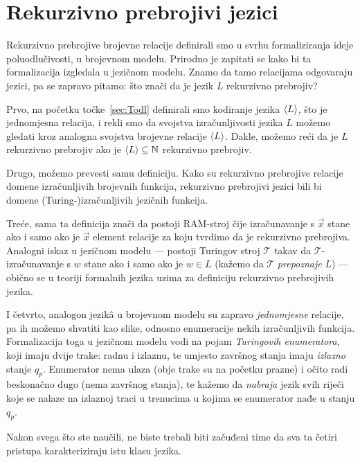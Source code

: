 \section{Rekurzivno prebrojivi jezici}\label{sec:relang}

Rekurzivno prebrojive brojevne relacije definirali smo u svrhu formaliziranja ideje poluodlučivosti, u brojevnom modelu. Prirodno je zapitati se kako bi ta formalizacija izgledala u jezičnom modelu. Znamo da tamo relacijama odgovaraju jezici, pa se zapravo pitamo: što znači da je jezik $L$ rekurzivno prebrojiv?

Prvo, na početku točke~\ref{sec:Todl} definirali smo kodiranje jezika $\langle L\rangle$, što je jednomjesna relacija, i rekli smo da svojstva izračunljivosti jezika $L$ možemo gledati kroz analogna svojstva brojevne relacije $\langle L\rangle$. Dakle, možemo reći da je $L$ rekurzivno prebrojiv ako je $\langle L\rangle\subseteq{\mathbb N}$ rekurzivno prebrojiv.

Drugo, možemo prevesti samu definiciju. Kako su rekurzivno prebrojive relacije domene izračunljivih brojevnih funkcija, rekurzivno prebrojivi jezici bili bi domene (Turing-)izračunljivih jezičnih funkcija.

Treće, sama ta definicija znači da postoji RAM-stroj čije izračunavanje s $\vec x$ stane ako i samo ako je $\vec x$ element relacije za koju tvrdimo da je rekurzivno prebrojiva. Analogni iskaz u jezičnom modelu --- postoji Turingov stroj $\mathcal T$ takav da $\mathcal T$-izračunavanje s $w$ stane ako i samo ako je $w\in L$ (kažemo da $\mathcal T$ \emph{prepoznaje} $L$) --- obično se u teoriji formalnih jezika uzima za definiciju rekurzivno prebrojivih jezika.

I četvrto, analogon jezik\^a u brojevnom modelu su zapravo \emph{jednomjesne} relacije, pa ih možemo shvatiti kao slike, odnosno enumeracije nekih izračunljivih funkcija. Formalizacija toga u jezičnom modelu vodi na pojam \emph{Turingovih enumeratora}, koji imaju dvije trake: radnu i izlaznu, te umjesto završnog stanja imaju \emph{izlazno} stanje $q_p$. Enumerator nema ulaza (obje trake su na početku prazne) i očito radi beskonačno dugo (nema završnog stanja), te kažemo da \emph{nabraja} jezik svih riječi koje se nalaze na izlaznoj traci u trenucima u kojima se enumerator nađe u stanju $q_p$.

Nakon svega što ste naučili, ne biste trebali biti začuđeni time da sva ta četiri pristupa karakteriziraju istu klasu jezika.

